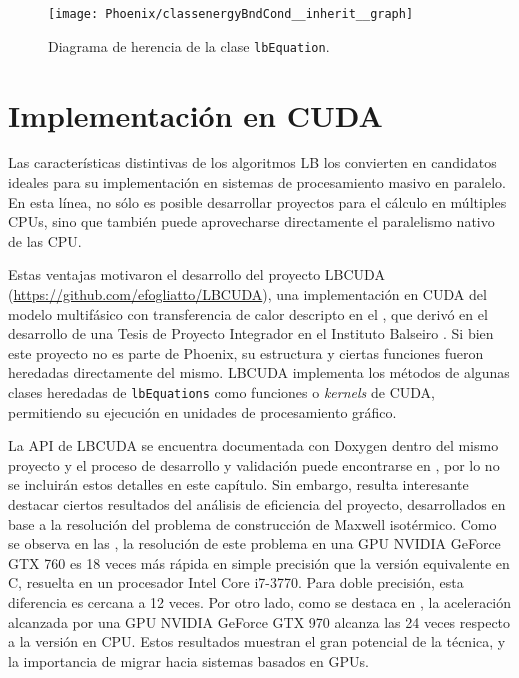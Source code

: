 \begin{figure}[ht]
	\centering
	\texttt{[image: Phoenix/classenergyBndCond\_\_inherit\_\_graph]}
	\caption{Diagrama de herencia de la clase \texttt{lbEquation}.}
	\label{fig:energy_bnd}
\end{figure}



\section{Implementaci\'on en CUDA}

Las caracter\'isticas distintivas de los algoritmos LB los convierten en candidatos ideales para su implementaci\'on en sistemas de procesamiento masivo en paralelo. En esta l\'inea, no s\'olo es posible desarrollar proyectos para el c\'alculo en m\'ultiples CPUs, sino que tambi\'en puede aprovecharse directamente el paralelismo nativo de las CPU.

Estas ventajas motivaron el desarrollo del proyecto LBCUDA (\url{https://github.com/efogliatto/LBCUDA}), una implementaci\'on en CUDA del modelo multif\'asico con transferencia de calor descripto en el , que deriv\'o en el desarrollo de una Tesis de Proyecto Integrador en el Instituto Balseiro \cite{coronel_implementacion_2020}. Si bien este proyecto no es parte de Phoenix, su estructura y ciertas funciones fueron heredadas directamente del mismo. LBCUDA implementa los m\'etodos de algunas clases heredadas de \texttt{lbEquations} como funciones o \emph{kernels} de CUDA, permitiendo su ejecuci\'on en unidades de procesamiento gr\'afico.

La API de LBCUDA se encuentra documentada con Doxygen dentro del mismo proyecto y el proceso de desarrollo y validaci\'on puede encontrarse en \cite{coronel_implementacion_2020}, por lo no se incluir\'an estos detalles en este cap\'itulo. Sin embargo, resulta interesante destacar ciertos resultados del an\'alisis de eficiencia del proyecto, desarrollados en base a la resoluci\'on del problema de construcci\'on de Maxwell isot\'ermico. Como se observa en las , la resoluci\'on de este problema en una GPU NVIDIA GeForce GTX 760 es 18 veces m\'as r\'apida en simple precisi\'on que la versi\'on equivalente en C, resuelta en un procesador Intel Core i7-3770. Para doble precisi\'on, esta diferencia es cercana a 12 veces. Por otro lado, como se destaca en \cite{coronel_implementacion_2020}, la aceleraci\'on alcanzada por una GPU NVIDIA GeForce GTX 970 alcanza las 24 veces respecto a la versi\'on en CPU. Estos resultados muestran el gran potencial de la t\'ecnica, y la importancia de migrar hacia sistemas basados en GPUs.

